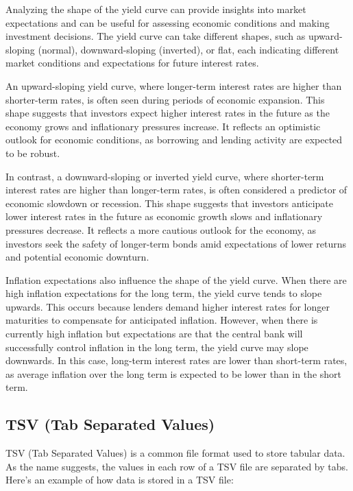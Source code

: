 \documentclass[
]{book}
\begin{document}
Analyzing the shape of the yield curve can provide insights into market expectations and can be useful for assessing economic conditions and making investment decisions. The yield curve can take different shapes, such as upward-sloping (normal), downward-sloping (inverted), or flat, each indicating different market conditions and expectations for future interest rates.

An upward-sloping yield curve, where longer-term interest rates are higher than shorter-term rates, is often seen during periods of economic expansion. This shape suggests that investors expect higher interest rates in the future as the economy grows and inflationary pressures increase. It reflects an optimistic outlook for economic conditions, as borrowing and lending activity are expected to be robust.

In contrast, a downward-sloping or inverted yield curve, where shorter-term interest rates are higher than longer-term rates, is often considered a predictor of economic slowdown or recession. This shape suggests that investors anticipate lower interest rates in the future as economic growth slows and inflationary pressures decrease. It reflects a more cautious outlook for the economy, as investors seek the safety of longer-term bonds amid expectations of lower returns and potential economic downturn.

Inflation expectations also influence the shape of the yield curve. When there are high inflation expectations for the long term, the yield curve tends to slope upwards. This occurs because lenders demand higher interest rates for longer maturities to compensate for anticipated inflation. However, when there is currently high inflation but expectations are that the central bank will successfully control inflation in the long term, the yield curve may slope downwards. In this case, long-term interest rates are lower than short-term rates, as average inflation over the long term is expected to be lower than in the short term.

\hypertarget{tsv-tab-separated-values}{%
\subsection{TSV (Tab Separated Values)}\label{tsv-tab-separated-values}}

TSV (Tab Separated Values) is a common file format used to store tabular data. As the name suggests, the values in each row of a TSV file are separated by tabs. Here's an example of how data is stored in a TSV file:
\end{document}
